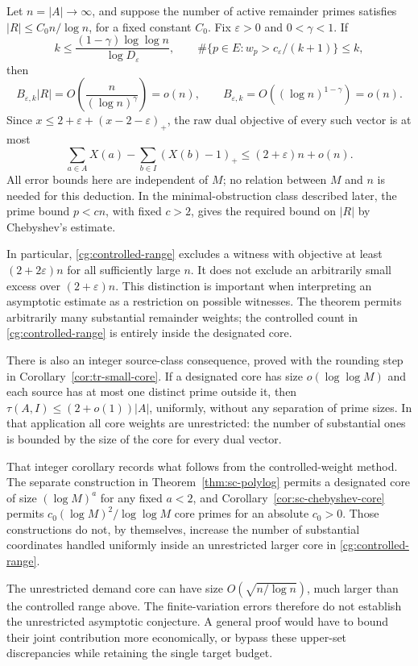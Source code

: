 Let \(n=|A|\to\infty\), and suppose the number of active remainder
primes satisfies \(|R|\le C_0n/\log n\), for a fixed constant
\(C_0\). Fix \(\varepsilon>0\) and \(0<\gamma<1\). If
\begin{equation}
 k\le\frac{(1-\gamma)\log\log n}{\log D_\varepsilon},
 \qquad
 \#\{p\in E:w_p>c_\varepsilon/(k+1)\}\le k,
 \label{cg:controlled-range}
\end{equation}
then
\[
 B_{\varepsilon,k}|R|
 =O\!\left(\frac{n}{(\log n)^\gamma}\right)=o(n),
 \qquad B_{\varepsilon,k}=O((\log n)^{1-\gamma})=o(n).
\]
Since \(x\le2+\varepsilon+(x-2-\varepsilon)_+\), the raw
dual objective of every such vector is at most
\begin{equation}
 \sum_{a\in A}X(a)-\sum_{b\in I}(X(b)-1)_+
 \le(2+\varepsilon)n+o(n).
 \label{cg:dual-exclusion}
\end{equation}
All error bounds here are independent of \(M\); no relation
between \(M\) and \(n\) is needed for this deduction. In the
minimal-obstruction class described later, the prime bound
\(p<cn\), with fixed \(c>2\), gives the required bound on
\(|R|\) by Chebyshev's estimate.

In particular, \eqref{cg:controlled-range} excludes a witness with
objective at least \((2+2\varepsilon)n\) for all sufficiently large
\(n\). It does not exclude an arbitrarily small excess over
\((2+\varepsilon)n\). This distinction is important when interpreting
an asymptotic estimate as a restriction on possible witnesses.
The theorem permits arbitrarily many substantial remainder weights;
the controlled count in \eqref{cg:controlled-range} is entirely
inside the designated core.

There is also an integer source-class consequence, proved with the
rounding step in Corollary~\ref{cor:tr-small-core}. If a designated
core has size \(o(\log\log M)\) and each source has at most one
distinct prime outside it, then
\(\tau(A,I)\le(2+o(1))|A|\), uniformly, without any separation of
prime sizes. In that application all core weights are unrestricted:
the number of substantial ones is bounded by the size of the core
for every dual vector.

That integer corollary records what follows from the controlled-weight
method. The separate construction in
Theorem~\ref{thm:sc-polylog} permits a designated core of size
\((\log M)^a\) for any fixed \(a<2\), and
Corollary~\ref{cor:sc-chebyshev-core} permits
\(c_0(\log M)^2/\log\log M\) core primes for an absolute \(c_0>0\).
Those constructions do not, by themselves,
increase the number of substantial coordinates handled uniformly
inside an unrestricted larger core in \eqref{cg:controlled-range}.

The unrestricted demand core can have size
\(O(\sqrt{n/\log n})\), much larger than the controlled range above.
The finite-variation errors therefore do not establish the
unrestricted asymptotic conjecture. A general proof would have to
bound their joint contribution more economically, or bypass these
upper-set discrepancies while retaining the single target budget.
